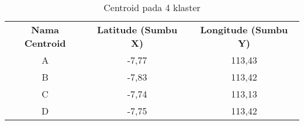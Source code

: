 \begin{table}[H]
\footnotesize
\centering
\begin{tabular}{ccc}
\rowcolor[HTML]{4472C4} 
{\color[HTML]{FFFFFF} \textbf{Nama   Centroid}} & {\color[HTML]{FFFFFF} \textbf{Latitude (Sumbu X)}} & {\color[HTML]{FFFFFF} \textbf{Longitude (Sumbu Y)}} \\
\rowcolor[HTML]{D9E1F2} 
A & -7,77 & 113,43 \\
B & -7,83 & 113,42 \\
\rowcolor[HTML]{D9E1F2} 
C & -7,74 & 113,13 \\
D & -7,75 & 113,42
\end{tabular}
\caption{Centroid pada 4 klaster}
\label{tab:center4}
\end{table}	